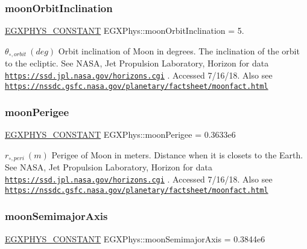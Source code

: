 \subsubsection{\texorpdfstring{moon\+Orbit\+Inclination}{moonOrbitInclination}}
{\footnotesize\ttfamily \mbox{\hyperlink{group___e_g_x_phys-_constants-_macros_ga76980d288494ce1714c9ac68a95ba702}{E\+G\+X\+P\+H\+Y\+S\+\_\+\+C\+O\+N\+S\+T\+A\+NT}} E\+G\+X\+Phys\+::moon\+Orbit\+Inclination = 5.}

$ \theta_{\circ,orbit} \ (deg)$ Orbit inclination of Moon in degrees. The inclination of the orbit to the ecliptic. See N\+A\+SA, Jet Propulsion Laboratory, Horizon for data \href{https://ssd.jpl.nasa.gov/horizons.cgi}{\tt https\+://ssd.\+jpl.\+nasa.\+gov/horizons.\+cgi} . Accessed 7/16/18. Also see \href{https://nssdc.gsfc.nasa.gov/planetary/factsheet/moonfact.html}{\tt https\+://nssdc.\+gsfc.\+nasa.\+gov/planetary/factsheet/moonfact.\+html} \mbox{\label{group___e_g_x_phys-_constants-_astrophysics-_solar_system-_moon-_orbit_ga3ac548dafccbac7cc3c79169fb0503a9}} 
\subsubsection{\texorpdfstring{moon\+Perigee}{moonPerigee}}
{\footnotesize\ttfamily \mbox{\hyperlink{group___e_g_x_phys-_constants-_macros_ga76980d288494ce1714c9ac68a95ba702}{E\+G\+X\+P\+H\+Y\+S\+\_\+\+C\+O\+N\+S\+T\+A\+NT}} E\+G\+X\+Phys\+::moon\+Perigee = 0.\+3633e6}

$ r_{\circ,peri} \ (m)$ Perigee of Moon in meters. Distance when it is closets to the Earth. See N\+A\+SA, Jet Propulsion Laboratory, Horizon for data \href{https://ssd.jpl.nasa.gov/horizons.cgi}{\tt https\+://ssd.\+jpl.\+nasa.\+gov/horizons.\+cgi} . Accessed 7/16/18. Also see \href{https://nssdc.gsfc.nasa.gov/planetary/factsheet/moonfact.html}{\tt https\+://nssdc.\+gsfc.\+nasa.\+gov/planetary/factsheet/moonfact.\+html} \mbox{\label{group___e_g_x_phys-_constants-_astrophysics-_solar_system-_moon-_orbit_ga1fac63237134644c174ae48640be1fdc}} 
\subsubsection{\texorpdfstring{moon\+Semimajor\+Axis}{moonSemimajorAxis}}
{\footnotesize\ttfamily \mbox{\hyperlink{group___e_g_x_phys-_constants-_macros_ga76980d288494ce1714c9ac68a95ba702}{E\+G\+X\+P\+H\+Y\+S\+\_\+\+C\+O\+N\+S\+T\+A\+NT}} E\+G\+X\+Phys\+::moon\+Semimajor\+Axis = 0.\+3844e6}


